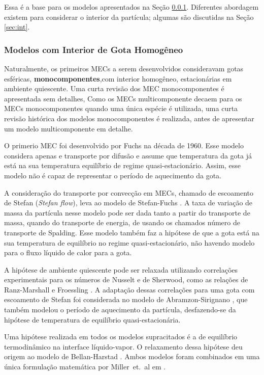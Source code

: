 Essa é a base para os modelos apresentados na Seção \ref{sec:RMM}.
Diferentes abordagem existem para considerar o interior da partícula; algumas são discutidas na Seção \ref{sec:int}.




\subsubsection{Modelos com Interior de Gota Homogêneo} \label{sec:RMM}

Naturalmente, os primeiros MECs a serem desenvolvidos consideravam gotas esféricas, \textbf{monocomponentes},com interior homogêneo, estacionárias em ambiente quiescente.
Uma curta revisão dos MEC monocomponentes é apresentada sem detalhes, 
Como os MECs multicomponente decaem para os MECs monocomponentes quando uma única espécie é utilizada, uma curta revisão histórica dos modelos monocomponentes é realizada, antes de apresentar um modelo multicomponente em detalhe.

O primerio MEC foi desenvolvido por Fuchs \cite{Fuchs1959} na década de 1960. 
Esse modelo considera apenas e transporte por difusão e assume que temperatura da gota já está na sua temperatura equilíbrio de regime quasi-estacionário.
Assim, esse modelo não é capaz de representar o período de aquecimento da gota.

A consideração do transporte por convecção em MECs, chamado de escoamento de Stefan (\emph{Stefan flow}), leva ao modelo de Stefan-Fuchs \cite{Law1978}.
A taxa de variação de massa da partícula nesse modelo pode ser dada tanto a partir do transporte de massa, quando do transporte de energia, de usando os chamados número de transporte de Spalding.
Esse modelo também faz a hipótese de que a gota está na sua temperatura de equilíbrio no regime quasi-estacionário, não havendo modelo para o fluxo líquido de calor para a gota.

A hipótese de ambiente quiescente pode ser relaxada utilizando correlações experimentais para os números de Nusselt e de Sherwood, como as relações de Ranz-Marshall \source{} e Froessling \source{}. 
A adaptação dessas correlações para uma gota com escoamento de Stefan foi considerada no modelo de Abramzon-Sirignano \cite{Sirignano1989}, que também modelou o período de aquecimento da partícula, desfazendo-se da hipótese de temperatura de equilíbrio quasi-estacionária.

Uma hipótese realizada em todos os modelos supracitados é a de equilíbrio termodinâmico na interface líquido-vapor.
O relaxamento dessa hipótese deu origem ao modelo de Bellan-Harstad \cite{BellanJ1987}.
Ambos modelos foram combinados em uma única formulação matemática por Miller~et.~al em \cite{MillerR1998}.

